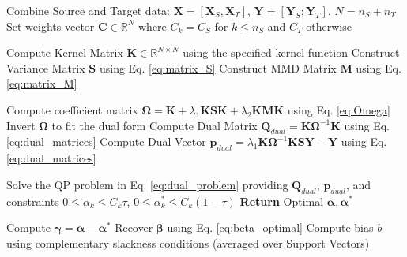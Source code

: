 \documentclass[a4paper]{cas-sc}
\begin{document}
\begin{algorithm}
\caption{TL-QLDMR Training Algorithm}
\label{alg:TL-QLDMR}

Combine Source and Target data: $\boldsymbol{X} = [\boldsymbol{X}_S, \boldsymbol{X}_T]$, $\boldsymbol{Y} = [\boldsymbol{Y}_S; \boldsymbol{Y}_T]$, $N = n_S + n_T$\;
Set weights vector $\boldsymbol{C} \in \mathbb{R}^N$ where $C_k = C_S$ for $k \le n_S$ and $C_T$ otherwise\;

Compute Kernel Matrix $\boldsymbol{K} \in \mathbb{R}^{N \times N}$ using the specified kernel function\;
Construct Variance Matrix $\mathbf{S}$ using Eq. \eqref{eq:matrix_S}\;
Construct MMD Matrix $\mathbf{M}$ using Eq. \eqref{eq:matrix_M}\;

Compute coefficient matrix $\boldsymbol{\Omega} = \boldsymbol{K} + \lambda_1 \boldsymbol{K} \mathbf{S} \boldsymbol{K} + \lambda_2 \boldsymbol{K} \mathbf{M} \boldsymbol{K}$ using Eq. \eqref{eq:Omega}\;
Invert $\boldsymbol{\Omega}$ to fit the dual form\;
Compute Dual Matrix $\mathbf{Q}_{dual} = \boldsymbol{K} \boldsymbol{\Omega}^{-1} \boldsymbol{K}$ using Eq. \eqref{eq:dual_matrices}\;
Compute Dual Vector $\mathbf{p}_{dual} = \lambda_1 \boldsymbol{K} \boldsymbol{\Omega}^{-1} \boldsymbol{K} \mathbf{S} \boldsymbol{Y} - \boldsymbol{Y}$ using Eq. \eqref{eq:dual_matrices}\;

Solve the QP problem in Eq. \eqref{eq:dual_problem} providing $\mathbf{Q}_{dual}$, $\mathbf{p}_{dual}$, and constraints $0 \le \alpha_k \le C_k\tau$, $0 \le \alpha_k^* \le C_k(1-\tau)$\;
\textbf{Return} Optimal $\boldsymbol{\alpha}, \boldsymbol{\alpha}^*$\;

Compute $\boldsymbol{\gamma} = \boldsymbol{\alpha} - \boldsymbol{\alpha}^*$\;
Recover $\boldsymbol{\beta}$ using Eq. \eqref{eq:beta_optimal}\;
Compute bias $b$ using complementary slackness conditions (averaged over Support Vectors)\;
\end{algorithm}
\end{document}
